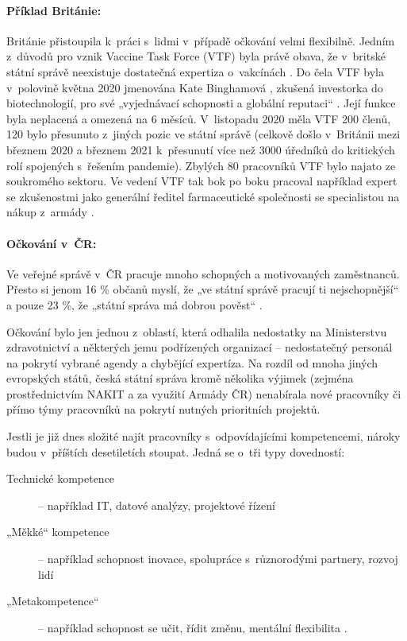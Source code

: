 \paragraph{Příklad Británie:} Británie přistoupila k~práci s~lidmi v~případě očkování velmi flexibilně. Jedním z~důvodů pro vznik Vaccine Task Force (VTF) byla právě obava, že v~britské státní správě neexistuje dostatečná expertiza o~vakcínách \cite{balls_secrets_2021}. Do čela VTF byla v~polovině května 2020 jmenována Kate Binghamová \cite{department_for_business_energy__industrial_strategy_statement_2020}, zkušená investorka do biotechnologií, pro své „vyjednávací schopnosti a globální reputaci“ \cite{department_for_business_energy__industrial_strategy_statement_2020}. Její funkce byla neplacená a omezená na 6 měsíců. V~listopadu 2020 měla VTF 200 členů, 120 bylo přesunuto z~jiných pozic ve státní správě (celkově došlo v~Británii mezi březnem 2020 a březnem 2021 k~přesunutí více než 3000 úředníků do kritických rolí spojených s~řešením pandemie). Zbylých 80 pracovníků VTF bylo najato ze soukromého sektoru. Ve vedení VTF tak bok po boku pracoval například expert se zkušenostmi jako generální ředitel farmaceutické společnosti se specialistou na nákup z~armády \cite{national_audit_office_investigation_2020}.

\paragraph{Očkování v~ČR:} Ve veřejné správě v~ČR pracuje mnoho schopných a motivovaných zaměstnanců. Přesto si jenom 16 \% občanů myslí, že „ve státní správě pracují ti nejschopnější“ a pouze 23 \%, že „státní správa má dobrou pověst“ \cite{aspen_vnimani_2021}.

Očkování bylo jen jednou z~oblastí, která odhalila nedostatky na Ministerstvu zdravotnictví a některých jemu podřízených organizací -- nedostatečný personál na pokrytí vybrané agendy a chybějící expertíza. Na rozdíl od mnoha jiných evropských států, česká státní správa kromě několika výjimek (zejména prostřednictvím NAKIT a za využití Armády ČR) nenabírala nové pracovníky či přímo týmy pracovníků na pokrytí nutných prioritních projektů.

Jestli je již dnes složité najít pracovníky s~odpovídajícími kompetencemi, nároky budou v~příštích desetiletích stoupat. Jedná se o~tři typy dovedností:

\begin{description}
  \item[Technické kompetence] -- například IT, datové
analýzy, projektové řízení \cite{thomas_finding_2021, hlidac_nedigitalni_2021}
  \item[„Měkké“ kompetence] -- například schopnost inovace, spolupráce
s~různorodými partnery, rozvoj lidí \cite{oecd_public_governance_reviews_skills_2020}
  \item[„Metakompetence“] -- například schopnost se učit, řídit změnu, mentální
flexibilita \cite{dondi_future-citizen_2020}.
  
\end{description}

